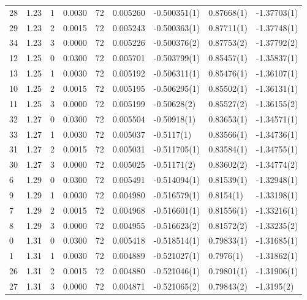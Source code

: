 \begin{tabular}{lrrrrrlll}
28 &  1.23 &       1 &    0.0030 &     72 &  0.005260 &   -0.500351(1) &  0.87668(1) &  -1.37703(1) \\
29 &  1.23 &       2 &    0.0015 &     72 &  0.005243 &   -0.500363(1) &  0.87711(1) &  -1.37748(1) \\
34 &  1.23 &       3 &    0.0000 &     72 &  0.005226 &   -0.500376(2) &  0.87753(2) &  -1.37792(2) \\
12 &  1.25 &       0 &    0.0300 &     72 &  0.005701 &   -0.503799(1) &  0.85457(1) &  -1.35837(1) \\
13 &  1.25 &       1 &    0.0030 &     72 &  0.005192 &   -0.506311(1) &  0.85476(1) &  -1.36107(1) \\
10 &  1.25 &       2 &    0.0015 &     72 &  0.005195 &   -0.506295(1) &  0.85502(1) &  -1.36131(1) \\
11 &  1.25 &       3 &    0.0000 &     72 &  0.005199 &    -0.50628(2) &  0.85527(2) &  -1.36155(2) \\
32 &  1.27 &       0 &    0.0300 &     72 &  0.005504 &    -0.50918(1) &  0.83653(1) &  -1.34571(1) \\
33 &  1.27 &       1 &    0.0030 &     72 &  0.005037 &     -0.5117(1) &  0.83566(1) &  -1.34736(1) \\
31 &  1.27 &       2 &    0.0015 &     72 &  0.005031 &   -0.511705(1) &  0.83584(1) &  -1.34755(1) \\
30 &  1.27 &       3 &    0.0000 &     72 &  0.005025 &    -0.51171(2) &  0.83602(2) &  -1.34774(2) \\
6  &  1.29 &       0 &    0.0300 &     72 &  0.005491 &   -0.514094(1) &  0.81539(1) &  -1.32948(1) \\
9  &  1.29 &       1 &    0.0030 &     72 &  0.004980 &   -0.516579(1) &   0.8154(1) &  -1.33198(1) \\
7  &  1.29 &       2 &    0.0015 &     72 &  0.004968 &   -0.516601(1) &  0.81556(1) &  -1.33216(1) \\
8  &  1.29 &       3 &    0.0000 &     72 &  0.004955 &   -0.516623(2) &  0.81572(2) &  -1.33235(2) \\
0  &  1.31 &       0 &    0.0300 &     72 &  0.005418 &   -0.518514(1) &  0.79833(1) &  -1.31685(1) \\
1  &  1.31 &       1 &    0.0030 &     72 &  0.004889 &   -0.521027(1) &   0.7976(1) &  -1.31862(1) \\
26 &  1.31 &       2 &    0.0015 &     72 &  0.004880 &   -0.521046(1) &  0.79801(1) &  -1.31906(1) \\
27 &  1.31 &       3 &    0.0000 &     72 &  0.004871 &   -0.521065(2) &  0.79843(2) &   -1.3195(2) \\
\bottomrule
\end{tabular}
